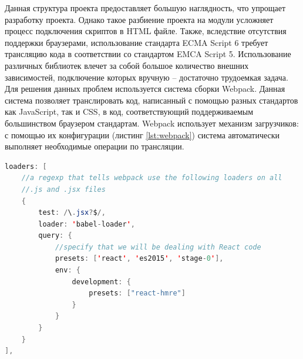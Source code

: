 Данная структура проекта предоставляет большую наглядность, что упрощает разработку проекта. Однако такое разбиение проекта на модули усложняет процесс подключения скриптов в HTML файле. Также, вследствие отсутствия поддержки браузерами, использование стандарта ECMA Script 6 требует трансляцию кода в соответствии со стандартом EMCA Script 5. Использование различных библиотек влечет за собой большое количество внешних зависимостей, подключение которых вручную -- достаточно трудоемкая задача. Для решения данных проблем используется система сборки Webpack. Данная система позволяет транслировать код, написанный с помощью разных стандартов как JavaScript, так и CSS, в код, соответствующий поддерживаемым большинством браузером стандартам. Webpack использует механизм загрузчиков: с помощью их конфигурации (листинг \ref{lst:webpack}) система автоматически выполняет необходимые операции по трансляции. 

\begin{lstlisting}[language=Java,
label=lst:webpack,
caption={Фрагмент конфигурационного файла Webpack.}]
loaders: [
	//a regexp that tells webpack use the following loaders on all 
	//.js and .jsx files
	{
		test: /\.jsx?$/,
		loader: 'babel-loader', 
		query: {
			//specify that we will be dealing with React code
			presets: ['react', 'es2015', 'stage-0'],
			env: {
				development: {
					presets: ["react-hmre"]
				}
			}
		}
	}
],
\end{lstlisting}





